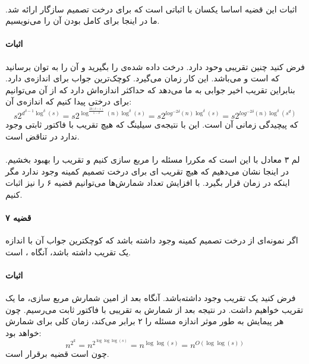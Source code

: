 \documentclass[a4paper]{article}
\begin{document}
 	\paragraph{}
 	اثبات این قضیه اساسا یکسان با اثباتی است که برای درخت تصمیم سازگار ارائه شد. ما در اینجا برای کامل بودن آن 
 	را می‌نویسیم.
 	\paragraph{اثبات}
 	فرض کنید چنین تقریبی وحود دارد. درخت داده شده‌ی 
 	را بگیرید و آن را به توان 
 	برسانید که
 	است و
 	می‌باشد. این کار زمان
 	می‌گیرد. کوچک‌ترین جواب برای
 	اندازه‌ی
 	دارد. بنابراین تقریب اخیر جوابی به ما می‌دهد که حداکثر اندازه‌اش
 	دارد که از آن می‌توانیم برای 
 	درختی پیدا کنیم که اندازه‌ی آن:
 	\[s2^{d^{\delta -1}\log^\delta(s)} = s2^{\log^{\frac{2\delta(\delta-1)}{1-\delta}}(n)\log^\delta(s)} =
 	s2^{log^{-2\delta}(n)\log^\delta(s)} = s2^{log^{-2\delta}(n)\log^\delta(s^d)}\]
 	که پیچیدگی زمانی آن
 	است. این با نتیجه‌ی سیلینگ که هیچ تقریب با فاکتور ثابتی وجود ندارد در تناقض است.
 	\paragraph{}
 	لم ۳ معادل با این است که مکررا مسئله را مربع سازی کنیم و تقریب را بهبود بخشیم. در اینجا نشان می‌دهیم که 
 	هیچ تقریب
 	ای برای درخت تصمیم کمینه وجود ندارد مگر اینکه
 	در زمان 
 	قرار بگیرد. با افزایش تعداد شمارش‌ها می‌توانیم قضیه ۶ را نیز اثبات کنیم.
 	\paragraph{قضیه ۷}
 	اگر نمونه‌ای از درخت تصمیم کمینه وجود داشته باشد که کوچکترین جواب آن با اندازه
 	یک تقریب
 	داشته باشد، آنگاه
 	،
 	است.
 	\paragraph{اثبات}
 	فرض کنید یک تقریب
 	وجود داشته‌باشد. آنگاه بعد از
 	امین شمارش مربع سازی، ما یک تقریب
 	خواهیم داشت. در نتیجه بعد از 
 	شمارش به تقریبی با فاکتور ثابت می‌رسیم. چون هر پیمایش به طور موثر اندازه مسئله را ۲ برابر می‌کند، زمان کلی برای
 	شمارش خواهد بود:
 	\[n^{2^k} = n^{2^{\log \log \log (s)}} = n^{\log \log(s)}= n^{O(\log \log(s))}\]
 	چون
 	است قضیه برقرار است. 
\end{document}
